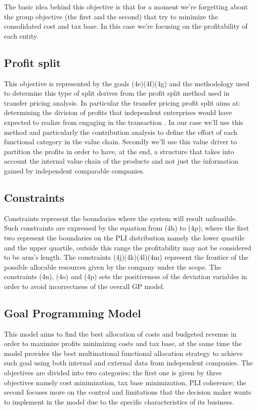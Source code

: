 \begin{doublespace}
The basic idea behind this objective is that for a moment we're forgetting about the group objective (the first and the second) that try to minimize the consolidated cost and tax base. In this case we're focusing on the profitability of each entity.

\subsection{Profit split}
This objective is represented by the goals (4e)(4f)(4g) and the methodology used to determine this type of split derives from the profit split method used in transfer pricing analysis. In particular the transfer pricing profit split aims at: determining the division of profits that independent enterprises would have expected to realize from engaging in the transaction \cite{OECD_ProfitSplit_2017}. In our case we'll use this method and particularly the contribution analysis to define the effort of each functional category in the value chain. Secondly we'll use this value driver to partition the profits in order to have, at the end, a structure that takes into account the internal value chain of the products and not just the information gained by independent comparable companies.


\subsection{Constraints}
Constraints represent the boundaries where the system will result unfeasible. Such constraints are expressed by the equation from (4h) to (4p); where the first two represent the boundaries on the PLI distribution namely the lower quartile and the upper quartile, outside this range the profitability may not be considered to be arm's length. The constraints (4j)(4k)(4l)(4m) represent the frontier of the possible allocable resources given by the company under the scope. The constraints (4n), (4o) and (4p) sets the positiveness of the deviation variables in order to avoid incorrectness of the overall GP model.

\subsection{Goal Programming Model}

This model aims to find the best allocation of costs and budgeted revenue in order to maximize profits minimizing costs and tax base, at the same time the model provides the best multinational functional allocation strategy to achieve such goal using both internal and external data from independent companies.
The objectives are divided into two categories; the first one is given by three objectives namely cost minimization, tax base minimization, PLI coherence; the second focuses more on the control and limitations that the decision maker wants to implement in the model due to the specific characteristics of its business.


\end{doublespace}
